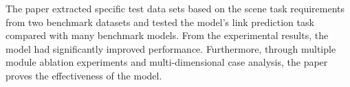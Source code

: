 The paper extracted specific test data sets based on the scene task requirements from two benchmark datasets and tested the model's link prediction task compared with many benchmark models. From the experimental results, the model had significantly improved performance. Furthermore, through multiple module ablation experiments and multi-dimensional case analysis, the paper proves the effectiveness of the model.